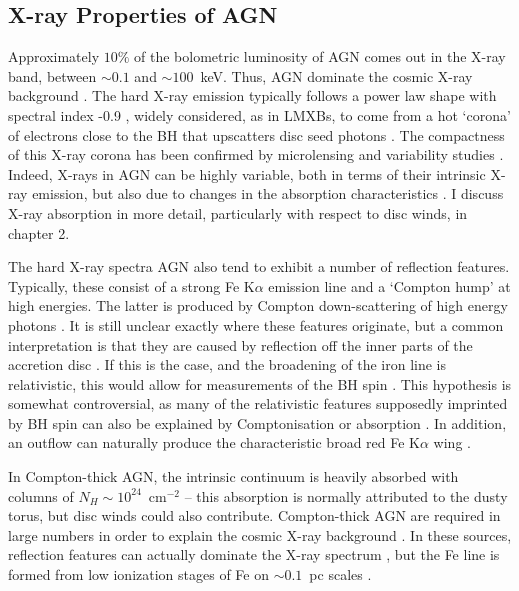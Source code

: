\subsection{X-ray Properties of AGN}

Approximately $10\%$ of the bolometric luminosity of AGN
comes out in the X-ray band, between $\sim0.1$ and $\sim100$~keV.
Thus, AGN dominate the cosmic X-ray background \citep{madau1994}.
The hard X-ray emission typically follows a power law shape with spectral
index -0.9 \citep[e.g.][]{koratkar1999}, 
widely considered, as in LMXBs, to come from a hot `corona' of 
electrons close to the BH that upscatters disc seed photons
\citep[e.g.][]{haardt1991}. The compactness of this X-ray corona
has been confirmed by microlensing \citep{chartas2009, dai2010} 
and variability studies \citep{green1993,crenshaw1996,risaliti2007,emmanoulopoulos2014}. 
Indeed, X-rays in AGN can be highly variable, both in terms of their intrinsic 
X-ray emission, but also due to changes in the absorption characteristics 
\citep{risaliti2002,miller2008,connolly2014}.
I discuss X-ray absorption in more detail, particularly with respect to disc winds, 
in chapter 2.

The hard X-ray spectra AGN also tend to exhibit a number of reflection features. 
Typically, these consist of a strong Fe K$\alpha$ emission line and a `Compton hump'
at high energies. The latter is produced by Compton down-scattering 
of high energy photons \citep{pounds1989,nandra1994}.
It is still unclear exactly where these features originate, 
but a common interpretation is that they are caused by 
reflection off the inner parts of the accretion disc 
\citep{fabian1995,iwasawa1996b,reynolds1999}.
If this is the case, and the broadening of the iron line is relativistic,
this would allow for measurements of the BH spin 
\citep{laor1991,iwasawa1996a,dabrowski1997}.
This hypothesis is somewhat controversial, as 
many of the relativistic features supposedly imprinted by BH spin can also be explained
by Comptonisation or absorption \citep[e.g.][]{misra1998,miller2013}.
In addition, an outflow can naturally produce the characteristic 
broad red Fe K$\alpha$ wing \citep{sim2010}.

In Compton-thick AGN, the intrinsic continuum is heavily absorbed with columns of
$N_H\sim10^{24}$~cm$^{-2}$ -- this absorption is normally attributed to the dusty torus, 
but disc winds could also contribute. Compton-thick AGN are required 
in large numbers in order to explain the cosmic X-ray background \citep{setti1989}.
In these sources, reflection features can actually dominate the X-ray spectrum 
\citep{alexander2011,gandhi2013}, but the Fe line is formed from low ionization
stages of Fe on $\sim0.1$~pc scales \citep{gandhi2015}.


